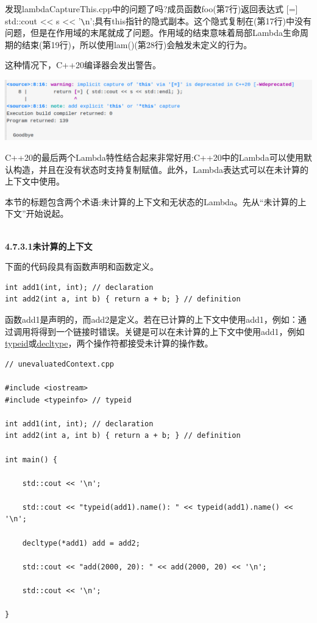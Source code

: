 发现lambdaCaptureThis.cpp中的问题了吗?成员函数foo(第7行)返回表达式 [=] {std::cout <{}< s <{}< '\verb|\|n';}具有this指针的隐式副本。这个隐式复制在(第17行)中没有问题，但是在作用域的末尾就成了问题。作用域的结束意味着局部Lambda生命周期的结束(第19行)，所以使用lam()(第28行)会触发未定义的行为。

这种情况下，C++20编译器会发出警告。

\begin{center}
\includegraphics[width=1.0\textwidth]{content/3/chapter4/images/1-8.png}\\
\end{center}

C++20的最后两个Lambda特性结合起来非常好用:C++20中的Lambda可以使用默认构造，并且在没有状态时支持复制赋值。此外，Lambda表达式可以在未计算的上下文中使用。


本节的标题包含两个术语:未计算的上下文和无状态的Lambda。先从“未计算的上下文”开始说起。

\hspace*{\fill} \\ %
\noindent
\textbf{4.7.3.1\hspace{0.2cm}未计算的上下文}

下面的代码段具有函数声明和函数定义。

\begin{lstlisting}[style=styleCXX]
int add1(int, int); // declaration
int add2(int a, int b) { return a + b; } // definition
\end{lstlisting}

函数add1是声明的，而add2是定义。若在已计算的上下文中使用add1，例如：通过调用将得到一个链接时错误。关键是可以在未计算的上下文中使用add1，例如\href{https://en.cppreference.com/w/cpp/language/typeid}{typeid}或\href{https://en.cppreference.com/w/cpp/language/decltype}{decltype}，两个操作符都接受未计算的操作数。

\begin{lstlisting}[style=styleCXX]
// unevaluatedContext.cpp

#include <iostream>
#include <typeinfo> // typeid

int add1(int, int); // declaration
int add2(int a, int b) { return a + b; } // definition

int main() {
	
	std::cout << '\n';
	
	std::cout << "typeid(add1).name(): " << typeid(add1).name() << '\n';
	
	decltype(*add1) add = add2;
	
	std::cout << "add(2000, 20): " << add(2000, 20) << '\n';
	
	std::cout << '\n';

}
\end{lstlisting}

